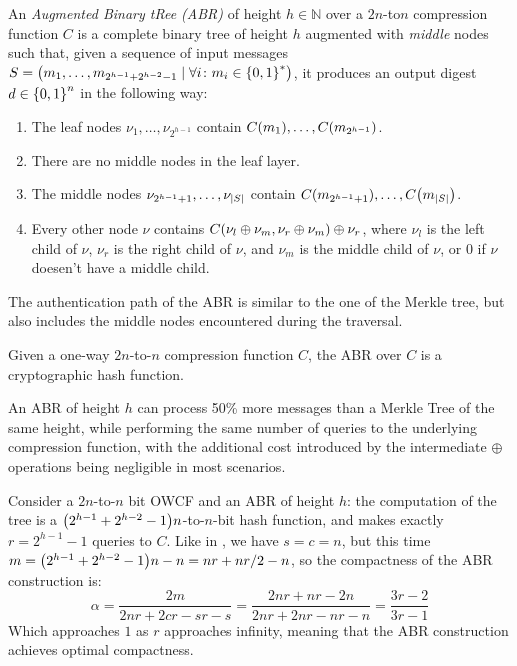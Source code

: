 \begin{definition}
	An \emph{Augmented Binary tRee (ABR)} of height \(h \in \mathbb{N}\) over a 
	\(2n\)-to\(n\) compression function \(C\) is a complete binary tree of height \(h\) 
	augmented with \emph{middle} nodes such that, given a sequence of input messages
	\(S = \left(m_1, \dots, m_{2^{h-1} + 2^{h-2}-1} \mid \forall i\colon m_i \in \left\{0, 1\right\}^{*}\right)\), 
	it produces an output digest \(d \in \left\{0, 1\right\}^n\) in the following way:
	\begin{enumerate}
		\item The leaf nodes \(\nu_{1}, \dots, \nu_{2^{h-1}}\) contain \(\call{C}{m_1}, \dots,
		      \call{C}{m_{2^{h-1}}}\).
		\item There are no middle nodes in the leaf layer.
		\item The middle nodes \(\nu_{2^{h-1}+1}, \dots, \nu_{\left\lvert S\right\rvert}\) contain
		      \(\call{C}{m_{2^{h-1}+1}}, \dots, \call{C}{m_{\abs{S}}}\).
		\item Every other node \(\nu \) contains \(\call{C}{\nu_l \oplus \nu_m, \nu_r \oplus
		      \nu_m} \oplus \nu_r \), where \(\nu_l\) is the left child of \(\nu \), \(\nu_r\)
		      is the right child of \(\nu \), and \(\nu_m\) is the middle child of \(\nu \), or \(0\)
		      if \(\nu \) doesen't have a middle child.
	\end{enumerate}
\end{definition}

The authentication path of the ABR is similar to the one of the Merkle tree, but also includes 
the middle nodes encountered during the traversal.

\begin{proposition}
	Given a one-way \(2n\)-to-\(n\) compression function \(C\), the ABR over \(C\) is a cryptographic 
	hash function.
\end{proposition}

An ABR of height \(h\) can process 50\% more messages than a Merkle Tree of the same height, 
while performing the same number of queries to the underlying compression function, with the 
additional cost introduced by the intermediate \(\oplus \) operations being negligible in most 
scenarios.

\begin{example}
	Consider a \(2n\)-to-\(n\) bit OWCF and an ABR of height \(h\): the computation 
	of the tree is a \(\Parens*{2^{h-1} + 2^{h-2}-1}n\)-to-\(n\)-bit hash function, 
	and makes exactly \(r = 2^{h-1} - 1\) queries to \(C\).
	Like in , we have \(s = c = n\), but this time 
	\(m = \Parens*{2^{h-1} + 2^{h-2}-1}n - n = nr + {nr}/2 - n\), so the compactness of the ABR 
	construction is:
	\[
		\alpha = \frac{2m}{2nr + 2cr - sr - s} = 
		\frac{2nr + nr - 2n}{2nr + 2nr - nr - n} =
		\frac{3r - 2}{3r - 1}
	\]
	Which approaches \(1\) as \(r\) approaches infinity, meaning that the ABR construction achieves
	optimal compactness.
\end{example}

